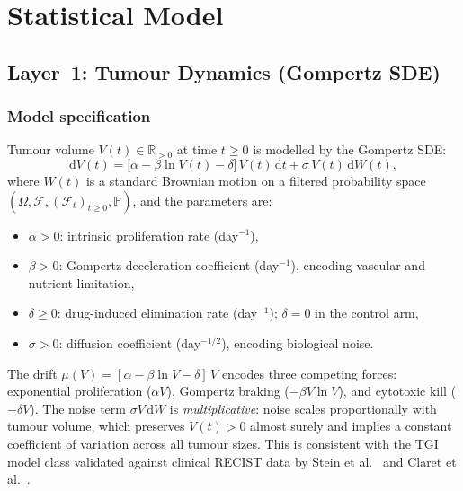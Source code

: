 \documentclass[11pt,a4paper]{article}
\newcommand{\R}{\mathbb{R}}
\newcommand{\Prob}{\mathbb{P}}
\newcommand{\dt}{\,\mathrm{d}t}
\newcommand{\dW}{\,\mathrm{d}W}
\begin{document}
\section{Statistical Model}
 
\subsection{Layer~1: Tumour Dynamics (Gompertz SDE)}
\label{sec:layer1}
 
\subsubsection{Model specification}
 
Tumour volume $V(t) \in \R_{>0}$ at time $t \geq 0$ is modelled by the
Gompertz SDE:
\begin{equation}
  \label{eq:gompertz-sde}
  \mathrm{d}V(t)
  = \bigl[\alpha - \beta \ln V(t) - \delta\bigr]\,V(t)\dt
  + \sigma\,V(t)\dW(t),
\end{equation}
where $W(t)$ is a standard Brownian motion on a filtered probability space
$(\Omega, \mathcal{F}, (\mathcal{F}_t)_{t\geq 0}, \Prob)$, and the
parameters are:
\begin{itemize}
  \item $\alpha > 0$: intrinsic proliferation rate (day$^{-1}$),
  \item $\beta > 0$: Gompertz deceleration coefficient (day$^{-1}$), encoding
        vascular and nutrient limitation,
  \item $\delta \geq 0$: drug-induced elimination rate (day$^{-1}$); $\delta = 0$
        in the control arm,
  \item $\sigma > 0$: diffusion coefficient (day$^{-1/2}$), encoding biological
        noise.
\end{itemize}
 
The drift $\mu(V) = [\alpha - \beta \ln V - \delta]\,V$ encodes three competing
forces: exponential proliferation ($\alpha V$), Gompertz braking ($-\beta V \ln V$),
and cytotoxic kill ($-\delta V$). The noise term $\sigma V\,\mathrm{d}W$ is
\emph{multiplicative}: noise scales proportionally with tumour volume, which
preserves $V(t) > 0$ almost surely and implies a constant coefficient of
variation across all tumour sizes. This is consistent with the TGI model class
validated against clinical RECIST data by Stein et al.~\cite{Stein2011} and
Claret et al.~\cite{Claret2013}.
 
\end{document}
